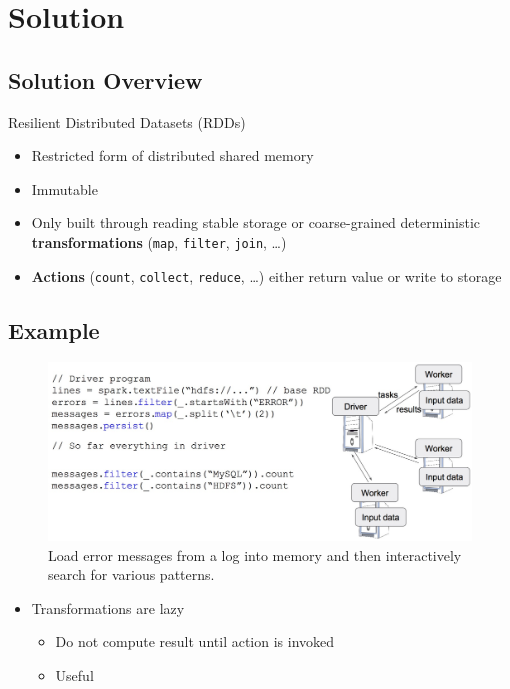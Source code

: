 \section{Solution}
\subsection{Solution Overview}
\begin{frame}
Resilient Distributed Datasets (RDDs)
\begin{itemize}
  \item Restricted form of distributed shared memory
  \item Immutable
  \item Only built through reading stable storage or coarse-grained
  deterministic \textbf{transformations} (\texttt{map}, \texttt{filter}, \texttt{join}, \ldots)
  \item \textbf{Actions} (\texttt{count}, \texttt{collect}, \texttt{reduce},
  \ldots) either return value or write to storage
\end{itemize}
\end{frame}

\subsection{Example}
\begin{frame}
\begin{figure}
\centering
\includegraphics[width=0.9\linewidth]{figures/example1.jpg}
\caption{Load error messages from a log into memory and then interactively
search for various patterns.}
\end{figure}
\end{frame}

\begin{frame}
\begin{itemize}
  \item Transformations are lazy
  		\begin{itemize}
  		  \item Do not compute result until action is invoked
  		  \item Useful
  		\end{itemize}
\end{itemize}
\end{frame}

